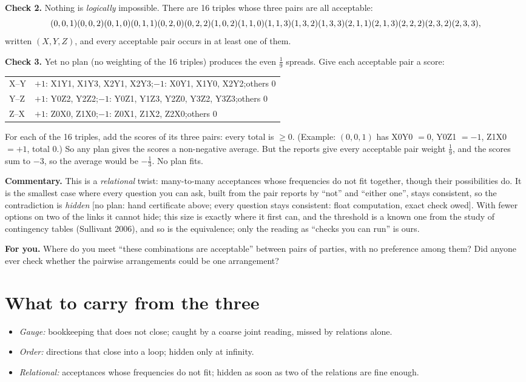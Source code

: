 \documentclass[11pt]{article}
\newcommand{\st}[1]{\textsf{\small[#1]}}
\begin{document}
\textbf{Check 2.} Nothing is \emph{logically} impossible. There are 16 triples whose
three pairs are all acceptable:
\[\scriptsize
(0,0,1)(0,0,2)(0,1,0)(0,1,1)(0,2,0)(0,2,2)(1,0,2)(1,1,0)(1,1,3)(1,3,2)(1,3,3)(2,1,1)(2,1,3)(2,2,2)(2,3,2)(2,3,3),
\]
written $(X,Y,Z)$, and every acceptable pair occurs in at least one of them.

\textbf{Check 3.} Yet no plan (no weighting of the 16 triples) produces the even
$\tfrac19$ spreads. Give each acceptable pair a score:
\begin{center}\small
\begin{tabular}{l|l}
X--Y & $+1$: X1Y1, X1Y3, X2Y1, X2Y3;\quad $-1$: X0Y1, X1Y0, X2Y2;\quad others 0\\
Y--Z & $+1$: Y0Z2, Y2Z2;\quad $-1$: Y0Z1, Y1Z3, Y2Z0, Y3Z2, Y3Z3;\quad others 0\\
Z--X & $+1$: Z0X0, Z1X0;\quad $-1$: Z0X1, Z1X2, Z2X0;\quad others 0
\end{tabular}
\end{center}
For each of the 16 triples, add the scores of its three pairs: every total is
$\ge0$. (Example: $(0,0,1)$ has X0Y0 $=0$, Y0Z1 $=-1$, Z1X0 $=+1$, total $0$.) So any
plan gives the scores a non-negative average. But the reports give every
acceptable pair weight $\tfrac19$, and the scores sum to $-3$, so the average would
be $-\tfrac13$. No plan fits.

\textbf{Commentary.} This is a \emph{relational} twist: many-to-many acceptances
whose frequencies do not fit together, though their possibilities do. It is the
smallest case where every question you can ask, built from the pair reports by
``not'' and ``either one'', stays consistent, so the contradiction is
\emph{hidden} \st{no plan: hand certificate above; every question stays consistent: float computation, exact check owed}. With fewer options on two of the
links it cannot hide; this size is exactly where it first can, and the
threshold is a known one from the study of contingency tables (Sullivant 2006), and so is the
equivalence; only the reading as ``checks you can run'' is ours.

\textbf{For you.} Where do you meet ``these combinations are acceptable'' between
pairs of parties, with no preference among them? Did anyone ever check whether
the pairwise arrangements could be one arrangement?

\section*{What to carry from the three}
\begin{itemize}[nosep]
  \item \emph{Gauge:} bookkeeping that does not close; caught by a coarse joint
    reading, missed by relations alone.
  \item \emph{Order:} directions that close into a loop; hidden only at infinity.
  \item \emph{Relational:} acceptances whose frequencies do not fit; hidden as soon
    as two of the relations are fine enough.
\end{itemize}
\end{document}
